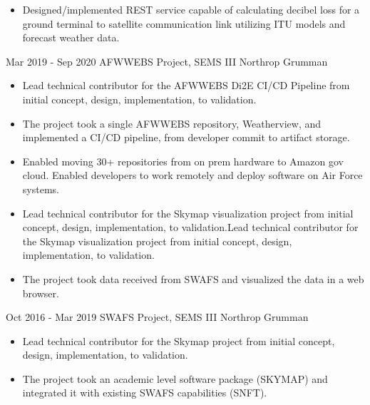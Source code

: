 \documentclass[]{src/friggeri-cv}
\begin{document}
\begin{entrylist}
{\begin{itemize}
        \item Designed/implemented REST service capable of calculating decibel loss for a ground terminal to satellite communication link utilizing ITU models and forecast weather data.
    \end{itemize}}
  \entry
    {Mar 2019 - Sep 2020}
    {AFWWEBS Project, SEMS III}
    {Northrop Grumman}
    {\begin{itemize}
        \item Lead technical contributor for the AFWWEBS Di2E CI/CD Pipeline from initial concept, design, implementation, to validation.
        \item The project took a single AFWWEBS repository, Weatherview, and implemented a CI/CD pipeline, from developer commit to artifact storage.
        \item Enabled moving 30+ repositories from on prem hardware to Amazon gov cloud. Enabled developers to work remotely and deploy software on Air Force systems.
        \item Lead technical contributor for the Skymap visualization project from initial concept, design, implementation, to validation.Lead technical contributor for the Skymap visualization project from initial concept, design, implementation, to validation.
        \item The project took data received from SWAFS and visualized the data in a web browser.
    \end{itemize}}
  \entry
    {Oct 2016 - Mar 2019}
    {SWAFS Project, SEMS III}
    {Northrop Grumman}
    {\begin{itemize}
        \item Lead technical contributor for the Skymap project from initial concept, design, implementation, to validation.
        \item The project took an academic level software package (SKYMAP) and integrated it with existing SWAFS capabilities (SNFT).
    \end{itemize}}
\end{entrylist}
\end{document}
